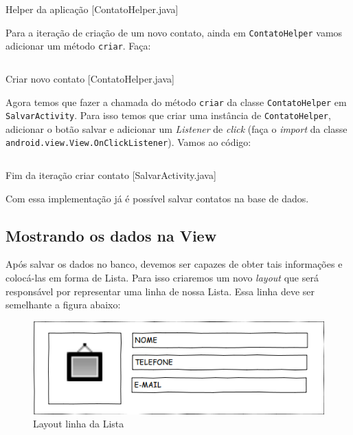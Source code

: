 \begin{listing}[H]
  \inputminted[linenos=true,frame=bottomline,tabsize=3]{ java }{ source/ContatoHelper-1.java }
  \caption{Helper da aplicação [ContatoHelper.java]}
\end{listing}

Para a iteração de criação de um novo contato, ainda em \texttt{ContatoHelper} vamos adicionar um método
\texttt{criar}. Faça:

\begin{listing}[H]
  \inputminted[linenos=true,frame=bottomline,tabsize=3]{ java }{ source/ContatoHelper-2.java }
  \caption{Criar novo contato [ContatoHelper.java]}
\end{listing}

Agora temos que fazer a chamada do método \texttt{criar} da classe \texttt{ContatoHelper} em
\texttt{SalvarActivity}. Para isso temos que criar uma instância de \texttt{ContatoHelper}, adicionar
o botão salvar e adicionar um \textit{Listener} de \textit{click} (faça o \textit{import}
da classe\\ \texttt{android.view.View.OnClickListener}). Vamos ao código:

\begin{listing}[H]
  \inputminted[linenos=true,frame=bottomline,tabsize=3]{ java }{ source/SalvarActivity-2.java }
  \caption{Fim da iteração criar contato [SalvarActivity.java]}
\end{listing}

Com essa implementação já é possível salvar contatos na base de dados.

\subsection{Mostrando os dados na View}

Após salvar os dados no banco, devemos ser capazes de obter tais informações e colocá-las em forma
de Lista. Para isso criaremos um novo \textit{layout} que será responsável por representar uma linha
de nossa Lista. Essa linha deve ser semelhante a figura abaixo:

\begin{figure}[h]
\centering
\includegraphics[scale=0.6]{img/layout-linha.png}
\caption{Layout linha da Lista}
\end{figure}

